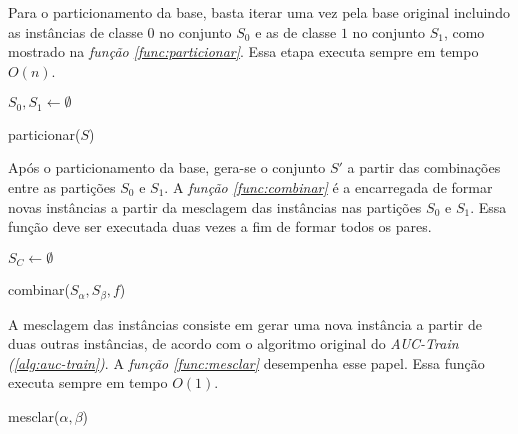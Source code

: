 Para o particionamento da base, basta iterar uma vez pela base original incluindo as instâncias de classe $0$ no conjunto $S_0$ e as de classe $1$ no conjunto $S_1$, como mostrado na \emph{função \ref{func:particionar}}. Essa etapa executa sempre em tempo $O(n)$.

\begin{function}[h!]
    
    $S_0, S_1 \gets \emptyset$\;
    
    

    \caption{particionar($S$)}
    \label{func:particionar}
\end{function}

Após o particionamento da base, gera-se o conjunto $S'$ a partir das combinações entre as partições $S_0$ e $S_1$. A \emph{função \ref{func:combinar}} é a encarregada de formar novas instâncias a partir da mesclagem das instâncias nas partições $S_0$ e $S_1$. Essa função deve ser executada duas vezes a fim de formar todos os pares.

\begin{function}[h!]

    $S_C \gets \emptyset$\;



    \caption{combinar($S_{\alpha}, S_{\beta}, f$)}
    \label{func:combinar}
\end{function}

A mesclagem das instâncias consiste em gerar uma nova instância a partir de duas outras instâncias, de acordo com o algoritmo original do \emph{AUC-Train (\ref{alg:auc-train})}. A \emph{função \ref{func:mesclar}} desempenha esse papel. Essa função executa sempre em tempo $O(1)$.

\begin{function}[h!]


    \caption{mesclar($\alpha, \beta$)}
    \label{func:mesclar}
\end{function}

